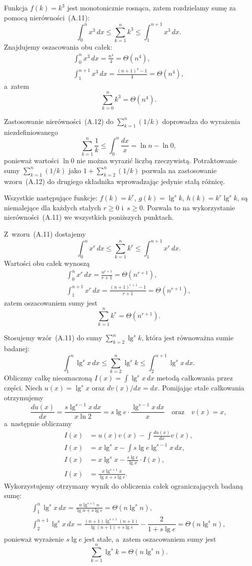 \exercise %
Funkcja $f(k)=k^3$ jest monotonicznie rosnąca, zatem rozdzielamy sumę za pomocą nierówności~(A.11):
\[
	\int_0^nx^3\,dx \le \sum_{k=1}^nk^3 \le \int_1^{n+1}x^3\,dx.
\]
Znajdujemy oszacowania obu całek:
\begin{gather*}
	\int_0^nx^3\,dx = \frac{n^4}{4} = \Theta(n^4), \\[2mm]
	\int_1^{n+1}x^3\,dx = \frac{(n+1)^4-1}{4} = \Theta(n^4),
\end{gather*}
a~zatem
\[
	\sum_{k=0}^nk^3 = \Theta(n^4).
\]

\exercise %
Zastosowanie nierówności~(A.12) do $\sum_{k=1}^n(1/k)$ doprowadza do wyrażenia niezdefiniowanego
\[
	\sum_{k=1}^n\frac{1}{k} \le \int_0^n\frac{dx}{x} = \ln n-\ln0,
\]
ponieważ wartości $\ln0$ nie można wyrazić liczbą rzeczywistą. Potraktowanie sumy $\sum_{k=1}^n(1/k)$ jako $1+\sum_{k=2}^n(1/k)$ pozwala na zastosowanie wzoru~(A.12) do drugiego składnika wprowadzając jedynie stałą różnicę.

\problems

Wszystkie następujące funkcje: $f(k)=k^r$, $g(k)=\lg^sk$, $h(k)=k^r\lg^sk$, są niemalejące dla każdych stałych $r\ge0$ i~$s\ge0$. Pozwala to na wykorzystanie nierówności~(A.11) we wszystkich poniższych punktach.

\subproblem %
Z~wzoru~(A.11) dostajemy
\[
	\int_0^nx^r\,dx \le \sum_{k=1}^nk^r \le \int_1^{n+1}x^r\,dx.
\]
Wartości obu całek wynoszą
\begin{gather*}
	\int_0^nx^r\,dx = \frac{n^{r+1}}{r+1} = \Theta(n^{r+1}), \\[2mm]
	\int_1^{n+1}x^r\,dx = \frac{(n+1)^{r+1}-1}{r+1} = \Theta(n^{r+1}),
\end{gather*}
zatem oszacowaniem sumy jest
\[
	\sum_{k=1}^nk^r = \Theta(n^{r+1}).
\]

\subproblem %
Stosujemy wzór~(A.11) do sumy $\sum_{k=2}^n\lg^sk$, która jest równoważna sumie badanej:
\[
	\int_1^n\lg^sx\,dx \le \sum_{k=2}^n\lg^sk \le \int_2^{n+1}\lg^sx\,dx.
\]
Obliczmy całkę nieoznaczoną $I(x) = \int\lg^sx\,dx$ metodą całkowania przez części. Niech $u(x)=\lg^sx$ oraz $dv(x)/dx=dx$. Pomijając stałe całkowania otrzymujemy
\[
	\frac{du(x)}{dx} = \frac{s\lg^{s-1}x\,dx}{x\ln 2} = s\lg e\cdot\frac{\lg^{s-1}x\,dx}{x} \quad\text{oraz}\quad v(x) = x,
\]
a~następnie obliczamy
\begin{align*}
	I(x) &= u(x)v(x)-\int\frac{du(x)}{dx}v(x), \\
	I(x) &= x\lg^sx-\int s\lg e\lg^{s-1}x\,dx, \\
	I(x) &= x\lg^sx-\frac{s\lg e}{\lg x}\cdot I(x), \\
	I(x) &= \frac{x\lg^{s+1}x}{\lg x+s\lg e}.
\end{align*}
Wykorzystujemy otrzymany wynik do obliczenia całek ograniczających badaną sumę:
\begin{gather*}
	{\int_1^n\lg^sx\,dx} = \frac{n\lg^{s+1}n}{\lg n+s\lg e} = \Theta(n\lg^sn), \\[2mm]
	{\int_2^{n+1}\lg^sx\,dx} = \frac{(n+1)\lg^{s+1}(n+1)}{\lg(n+1)+s\lg e}-\dfrac{2}{1+s\lg e} = \Theta(n\lg^sn),
\end{gather*}
ponieważ wyrażenie $s\lg e$ jest stałe, a~zatem oszacowaniem sumy jest
\[
	\sum_{k=1}^n\lg^sk = \Theta(n\lg^sn).
\]


